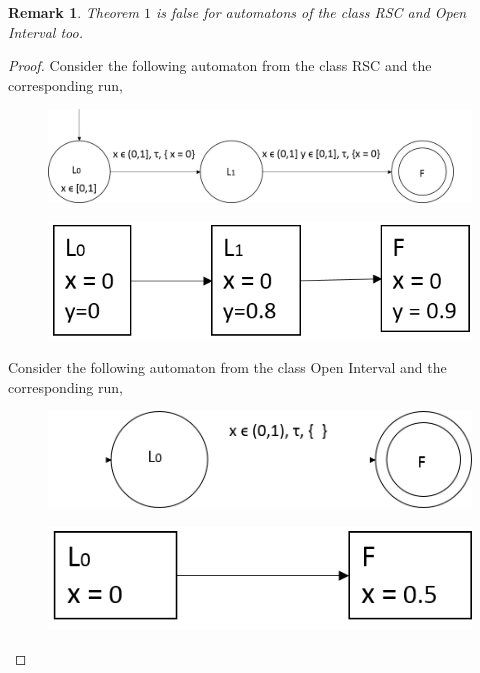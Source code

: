 \documentclass[12pt,letterpaper]{report}
\newtheorem{remark}{Remark}
\begin{document}
\begin{remark}
Theorem $1$ is false for automatons of the class RSC and Open Interval too.
\end{remark}
\begin{proof}
Consider the following automaton from the class RSC and the corresponding run,
\begin{figure}[h!]
\centering
\includegraphics[scale=0.7]{RSC.png}
\end{figure}

\begin{figure}[h!]
\centering
\includegraphics[scale=0.7]{rscrun.png}
\end{figure}


Consider the following automaton from the class Open Interval and the corresponding run,
\begin{figure}[h!]
\centering
\includegraphics[scale=0.7]{open.png}
\end{figure}

\begin{figure}[h!]
\centering
\includegraphics[scale=0.7]{openrun.png}
\end{figure}  
\end{proof}
\end{document}

